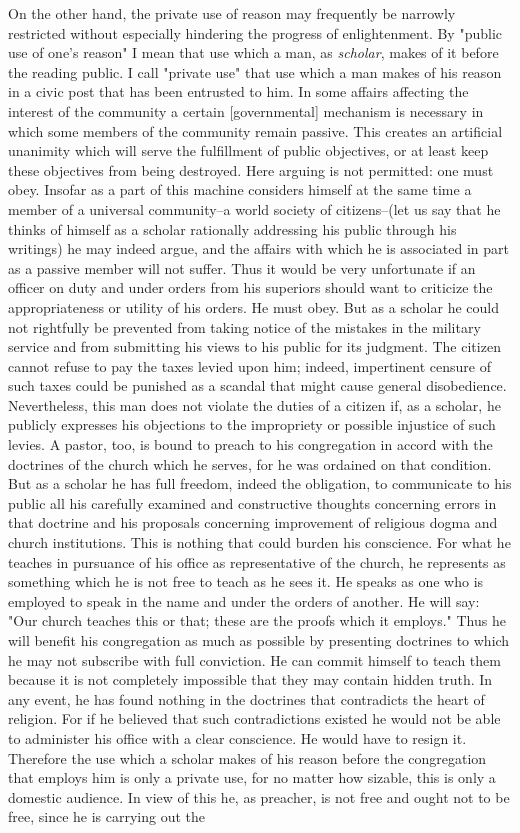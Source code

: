 \documentclass[12pt]{article}
\begin{document}
On the other hand, the private use of reason may frequently be narrowly restricted without especially hindering the progress of enlightenment. By "public use of one's reason" I mean that use which a man, as \textit{scholar}, makes of it before the reading public. I call "private use" that use which a man makes of his reason in a civic post that has been entrusted to him. In some affairs affecting the interest of the community a certain [governmental] mechanism is necessary in which some members of the community remain passive. This creates an artificial unanimity which will serve the fulfillment of public objectives, or at least keep these objectives from being destroyed. Here arguing is not permitted: one must obey. Insofar as a part of this machine considers himself at the same time a member of a universal community--a world society of citizens--(let us say that he thinks of himself as a scholar rationally addressing his public through his writings) he may indeed argue, and the affairs with which he is associated in part as a passive member will not suffer. Thus it would be very unfortunate if an officer on duty and under orders from his superiors should want to criticize the appropriateness or utility of his orders. He must obey. But as a scholar he could not rightfully be prevented from taking notice of the mistakes in the military service and from submitting his views to his public for its judgment. The citizen cannot refuse to pay the taxes levied upon him; indeed, impertinent censure of such taxes could be punished as a scandal that might cause general disobedience. Nevertheless, this man does not violate the duties of a citizen if, as a scholar, he publicly expresses his objections to the impropriety or possible injustice of such levies. A pastor, too, is bound to preach to his congregation in accord with the doctrines of the church which he serves, for he was ordained on that condition. But as a scholar he has full freedom, indeed the obligation, to communicate to his public all his carefully examined and constructive thoughts concerning errors in that doctrine and his proposals concerning improvement of religious dogma and church institutions. This is nothing that could burden his conscience. For what he teaches in pursuance of his office as representative of the church, he represents as something which he is not free to teach as he sees it. He speaks as one who is employed to speak in the name and under the orders of another. He will say: "Our church teaches this or that; these are the proofs which it employs." Thus he will benefit his congregation as much as possible by presenting doctrines to which he may not subscribe with full conviction. He can commit himself to teach them because it is not completely impossible that they may contain hidden truth. In any event, he has found nothing in the doctrines that contradicts the heart of religion. For if he believed that such contradictions existed he would not be able to administer his office with a clear conscience. He would have to resign it. Therefore the use which a scholar makes of his reason before the congregation that employs him is only a private use, for no matter how sizable, this is only a domestic audience. In view of this he, as preacher, is not free and ought not to be free, since he is carrying out the 
\end{document}
